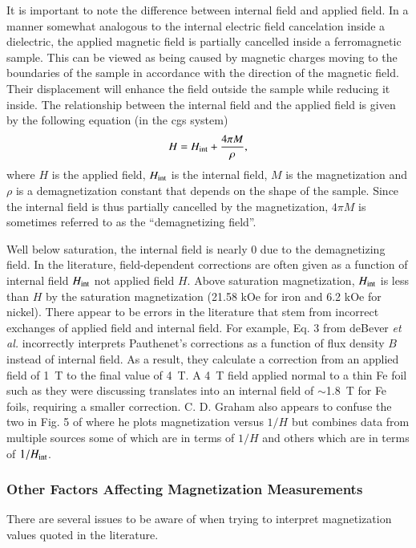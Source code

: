 \documentclass[preprint,12pt]{elsarticle}
\begin{document}
It is important to note the difference between internal field and applied field. In a manner somewhat analogous to the internal electric field cancelation inside a dielectric, the applied magnetic field is partially cancelled inside a ferromagnetic sample. This can be viewed as being caused by magnetic charges moving to the boundaries of the sample in accordance with the direction of the magnetic field. Their displacement will enhance the field outside the sample while reducing it inside. The relationship between the internal field and the applied field is given by the following equation (in the cgs system)
\begin{equation}
H=H_{\rm int}+\frac{4\pi M}{\rho},
\label{eq:Hint}
\end{equation}
where $H$ is the applied field, $H_{\rm int}$ is the internal field, $M$ is the magnetization and $\rho$ is a demagnetization constant that depends on the shape of the sample. Since the internal field is thus partially cancelled by the magnetization, $4\pi M$ is sometimes referred to as the ``demagnetizing field''. 

Well below saturation, the internal field is nearly 0 due to the demagnetizing field. In the literature, field-dependent corrections are often given as a function of internal field $H_{\rm int}$ not applied field $H$. Above saturation magnetization, $H_{\rm int}$ is less than $H$ by the saturation magnetization (21.58 kOe for iron and 6.2 kOe for nickel). There appear to be errors in the literature that stem from incorrect exchanges of applied field and internal field. For example, Eq. 3 from deBever {\it et al.} incorrectly interprets Pauthenet's corrections as a function of flux density $B$ instead of internal field. As a result, they calculate a correction from an applied field of 1~T to the final value of 4~T. A 4~T field applied normal to a thin Fe foil such as they were discussing translates into an internal field of $\sim$1.8~T for Fe foils, requiring a smaller correction. C. D. Graham also appears to confuse the two in Fig. 5  of \cite{Graham1982} where he plots magnetization versus $1/H$ but combines data from multiple sources some of which are in terms of $1/H$ and others which are in terms of $1/H_{\rm int}$.  

\subsubsection{\label{sec:other_factors}Other Factors Affecting Magnetization Measurements}
There are several issues to be aware of when trying to interpret magnetization values quoted in the literature.
\end{document}
